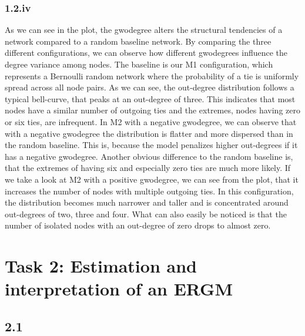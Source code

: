 \documentclass[
]{article}
\begin{document}
\subsubsection{1.2.iv}\label{iv-1}

As we can see in the plot, the gwodegree alters the structural
tendencies of a network compared to a random baseline network. By
comparing the three different configurations, we can observe how
different gwodegrees influence the degree variance among nodes. The
baseline is our M1 configuration, which represents a Bernoulli random
network where the probability of a tie is uniformly spread across all
node pairs. As we can see, the out-degree distribution follows a typical
bell-curve, that peaks at an out-degree of three. This indicates that
most nodes have a similar number of outgoing ties and the extremes,
nodes having zero or six ties, are infrequent. In M2 with a negative
gwodegree, we can observe that with a negative gwodegree the
distribution is flatter and more dispersed than in the random baseline.
This is, because the model penalizes higher out-degrees if it has a
negative gwodegree. Another obvious difference to the random baseline
is, that the extremes of having six and especially zero ties are much
more likely. If we take a look at M2 with a positive gwodegree, we can
see from the plot, that it increases the number of nodes with multiple
outgoing ties. In this configuration, the distribution becomes much
narrower and taller and is concentrated around out-degrees of two, three
and four. What can also easily be noticed is that the number of isolated
nodes with an out-degree of zero drops to almost zero.

\section{Task 2: Estimation and interpretation of an
ERGM}\label{task-2-estimation-and-interpretation-of-an-ergm}

\subsection{2.1}\label{section-2}
\end{document}

